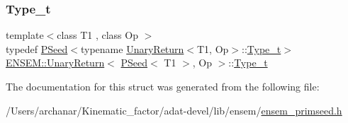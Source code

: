 \subsubsection{\texorpdfstring{Type\_t}{Type\_t}\hspace{0.1cm}{\footnotesize\ttfamily [3/3]}}
{\footnotesize\ttfamily template$<$class T1 , class Op $>$ \\
typedef \mbox{\hyperlink{classENSEM_1_1PSeed}{P\+Seed}}$<$typename \mbox{\hyperlink{structENSEM_1_1UnaryReturn}{Unary\+Return}}$<$T1, Op$>$\+::\mbox{\hyperlink{structENSEM_1_1UnaryReturn_3_01PSeed_3_01T1_01_4_00_01Op_01_4_a6145e0773bb5bec6d51ec81ef1837329}{Type\+\_\+t}}$>$ \mbox{\hyperlink{structENSEM_1_1UnaryReturn}{E\+N\+S\+E\+M\+::\+Unary\+Return}}$<$ \mbox{\hyperlink{classENSEM_1_1PSeed}{P\+Seed}}$<$ T1 $>$, Op $>$\+::\mbox{\hyperlink{structENSEM_1_1UnaryReturn_3_01PSeed_3_01T1_01_4_00_01Op_01_4_a6145e0773bb5bec6d51ec81ef1837329}{Type\+\_\+t}}}



The documentation for this struct was generated from the following file\+:\begin{DoxyCompactItemize}
\item 
/\+Users/archanar/\+Kinematic\+\_\+factor/adat-\/devel/lib/ensem/\mbox{\hyperlink{adat-devel_2lib_2ensem_2ensem__primseed_8h}{ensem\+\_\+primseed.\+h}}\end{DoxyCompactItemize}
